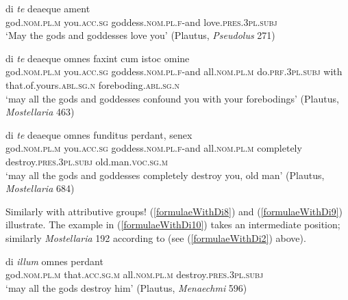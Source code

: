 \begin{exe}
\ex
\gll di \emph{te} deaeque ament\\
god.\textsc{nom.pl.m} you.\textsc{acc.sg} goddess.\textsc{nom.pl.f}-and love.\textsc{pres.3pl.subj}\\
\trans `May the gods and goddesses love you' (Plautus, \textit{Pseudolus} 271)
\label{formulaeWithDi5}
\end{exe}

\begin{exe}
\ex
\gll di \emph{te} deaeque omnes faxint cum istoc omine\\
god.\textsc{nom.pl.m} you.\textsc{acc.sg} goddess.\textsc{nom.pl.f}-and all.\textsc{nom.pl.m} do.\textsc{prf.3pl.subj} with that.of.yours.\textsc{abl.sg.n} foreboding.\textsc{abl.sg.n}\\
\trans `may all the gods and goddesses confound you with your forebodings' (Plautus, \textit{Mostellaria} 463)
\label{formulaeWithDi6}
\end{exe}%

\begin{exe}
\ex
\gll di \emph{te} deaeque omnes funditus perdant, senex\\
god.\textsc{nom.pl.m} you.\textsc{acc.sg} goddess.\textsc{nom.pl.f}-and all.\textsc{nom.pl.m} completely destroy.\textsc{pres.3pl.subj} old.man.\textsc{voc.sg.m}\\
\trans `may all the gods and goddesses completely destroy you, old man' (Plautus, \textit{Mostellaria} 684)
\label{formulaeWithDi7}
\end{exe}

Similarly with attributive groups! (\ref{formulaeWithDi8}) and (\ref{formulaeWithDi9}) illustrate. The example in (\ref{formulaeWithDi10}) takes an intermediate position; similarly \textit{Mostellaria} 192 according to \citet{Ritschl1852} (see (\ref{formulaeWithDi2}) above).

\begin{exe}
\ex
\gll di \emph{illum} omnes perdant\\
god.\textsc{nom.pl.m} that.\textsc{acc.sg.m} all.\textsc{nom.pl.m} destroy.\textsc{pres.3pl.subj}\\
\trans `may all the gods destroy him' (Plautus, \textit{Menaechmi} 596)
\label{formulaeWithDi8}
\end{exe}

